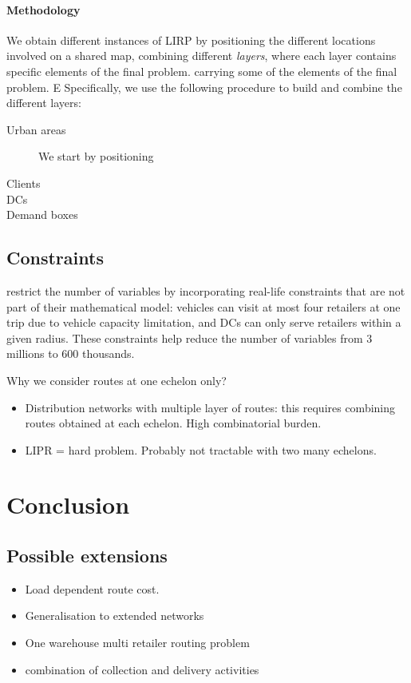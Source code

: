 \documentclass[a4paper,10pt]{article}
\begin{document}
\begin{linenumbers}
\paragraph{Methodology}
We obtain different instances of LIRP by positioning the different locations involved on a shared map, combining different {\em layers}, where each layer contains specific elements of the final problem.
carrying some of the elements of the final problem.
E
Specifically, we use the following procedure to build and combine the different layers:
\begin{description}
    \item[Urban areas] We start by positioning
    \item[Clients]
    \item[DCs]
    \item[Demand boxes]
\end{description}


\subsection{Constraints}

 \cite{Zheng2019} restrict the number of variables by incorporating real-life constraints that are not part of their mathematical model: 
 vehicles can visit at most four retailers at one trip due to vehicle capacity limitation, and DCs can only serve retailers within a given radius. 
 These constraints help reduce the number of variables from 3 millions to 600 thousands.
 
 
 Why we consider routes at one echelon only? 
 \begin{itemize}
 	\item Distribution networks with multiple layer of routes: this requires combining routes obtained at each echelon. High combinatorial burden. 
	\item LIPR = hard problem. Probably not tractable with two many echelons. 
 \end{itemize}

\section{Conclusion}



\subsection*{Possible extensions}
\begin{itemize}
	\item Load dependent route cost. 
	\item Generalisation to extended networks
	\item One warehouse multi retailer routing problem
	\item combination of collection and delivery activities
	
\end{itemize}


\end{linenumbers}

\newpage
%


\end{document}
